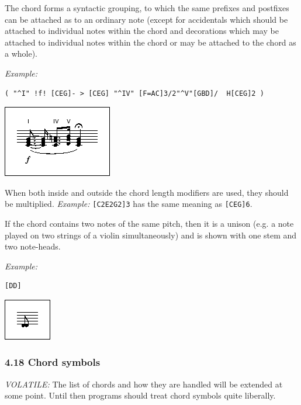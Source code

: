 \documentclass[oneside]{book}
\begin{document}
The chord forms a syntactic grouping, to which the same prefixes and
postfixes can be attached as to an ordinary note (except for accidentals
which should be attached to individual notes within the chord and
decorations which may be attached to individual notes within the chord
or may be attached to the chord as a whole).

\emph{Example:}

\begin{verbatim}
( "^I" !f! [CEG]- > [CEG] "^IV" [F=AC]3/2"^V"[GBD]/  H[CEG]2 )
\end{verbatim}

\href{/wiki/_detail/abc:standard:chords-80.png?id=abc\%3Astandard\%3Av2.1}{\includegraphics{wiki/_media/abc-standard-chords-80.png}}

When both inside and outside the chord length modifiers are used, they
should be multiplied. \emph{Example:} \texttt{{[}C2E2G2{]}3} has the
same meaning as \texttt{{[}CEG{]}6}.

If the chord contains two notes of the same pitch, then it is a unison
(e.g. a note played on two strings of a violin simultaneously) and is
shown with one stem and two note-heads.

\emph{Example:}

\begin{verbatim}
[DD]
\end{verbatim}

\href{/wiki/_detail/abc:standard:unison-80.png?id=abc\%3Astandard\%3Av2.1}{\includegraphics{wiki/_media/abc-standard-unison-80.png}}

\hypertarget{chord_symbols}{\subsubsection{4.18 Chord
symbols}\label{chord_symbols}}

\emph{VOLATILE:} The list of chords and how they are handled will be
extended at some point. Until then programs should treat chord symbols
quite liberally.
\end{document}
